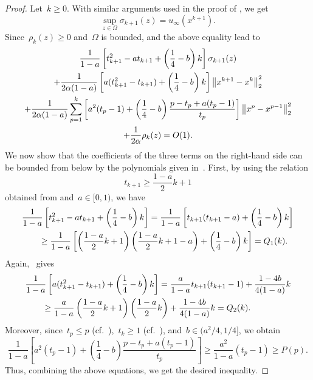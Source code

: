\documentclass[../main]{subfiles}
\begin{document}
\begin{proof}    
    Let~$k \ge 0$.
    With similar arguments used in the proof of , we get
    \begin{equation}
        \sup_{z \in \Omega} \sigma_{k + 1}(z) = u_\infty\left(x^{k + 1}\right)
    .\end{equation} 
    Since~$\rho_k(z) \ge 0$ and~$\Omega$ is bounded,  and the above equality lead to
    \begin{multline}
        \frac{1}{1 - a} \left[ t_{k + 1}^2 - a t_{k + 1} + \left( \frac{1}{4} - b \right) k \right] \sigma_{k + 1}(z) \\
        + \frac{1}{2 \alpha (1 - a)} \left[ a (t_{k + 1}^2 - t_{k + 1}) + \left( \frac{1}{4} - b \right) k \right] \norm*{x^{k + 1} - x^k}_2^2 \\
        + \frac{1}{2 \alpha (1 - a)} \sum_{p = 1}^{k} \left[ a^2 (t_p - 1) + \left( \frac{1}{4} - b \right) \frac{p - t_p + a(t_p - 1)}{t_p} \right] \norm*{x^p - x^{p - 1}}_2^2 \\
        + \frac{1}{2 \alpha} \rho_k(z)
        = O(1)
    .\end{multline}
    We now show that the coefficients of the three terms on the right-hand side can be bounded from below by the polynomials given in~.
    First, by using the relation
    \begin{equation} \label{eq:t k+1 geq}
        t_{k + 1} \ge \frac{1 - a}{2} k + 1
    \end{equation} 
    obtained from  and~$a \in [0, 1)$, we have
    \begin{align}
        \MoveEqLeft \frac{1}{1 - a} \left[ t_{k + 1}^2 - a t_{k + 1} + \left( \frac{1}{4} - b \right) k \right] = \frac{1}{1 - a} \left[ t_{k + 1} (t_{k + 1} - a) + \left( \frac{1}{4} - b \right) k \right] \\
        &\ge \frac{1}{1 - a} \left[ \left( \frac{1 - a}{2} k + 1 \right) \left( \frac{1 - a}{2} k + 1 - a \right) + \left( \frac{1}{4} - b \right) k \right] = Q_1(k)
    .\end{align}
    Again,~ gives
    \begin{align}
        \MoveEqLeft \frac{1}{1 - a} \left[ a (t_{k + 1}^2 - t_{k + 1}) + \left( \frac{1}{4} - b \right) k \right] 
        = \frac{a}{1 - a} t_{k + 1} (t_{k + 1} - 1) + \frac{1 - 4 b}{4 (1 - a)} k \\
        &\ge \frac{a}{1 - a} \left( \frac{1 - a}{2} k + 1 \right) \left( \frac{1 - a}{2} k \right) + \frac{1 - 4 b}{4 (1 - a)} k = Q_2(k)
    .\end{align}
    Moreover, since~$t_p \le p$ (cf.~),~$t_k \ge 1$ (cf.~), and~$b \in (a^2 / 4, 1 / 4]$, we obtain
    \begin{equation}
        \frac{1}{1 - a} \left[ a^2 (t_p - 1) + \left( \frac{1}{4} - b \right) \frac{p - t_p + a (t_p - 1)}{t_p} \right] \ge \frac{a^2}{1 - a} (t_p - 1) \ge P(p)
    .\end{equation} 
    Thus, combining the above equations, we get the desired inequality.
\end{proof}
\end{document}
